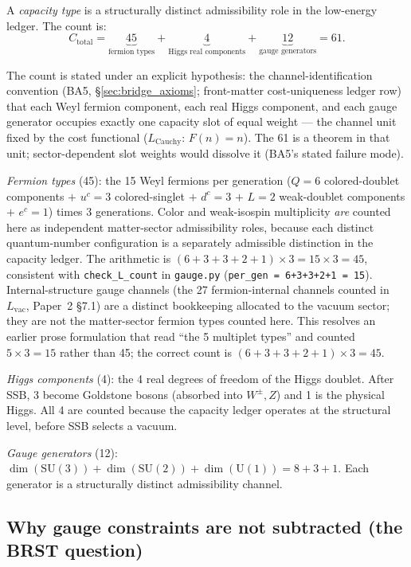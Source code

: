 \documentclass[11pt]{article}
\theoremstyle{definition}
\newcommand{\SU}{\mathrm{SU}}
\newcommand{\U}{\mathrm{U}}
\begin{document}
A \emph{capacity type} is a structurally distinct admissibility role
in the low-energy ledger.  The count is:
\begin{equation}
  C_{\mathrm{total}} = \underbrace{45}_{\text{fermion types}}
    + \underbrace{4}_{\text{Higgs real components}}
    + \underbrace{12}_{\text{gauge generators}} = 61.
\end{equation}

\noindent The count is stated under an explicit hypothesis: the
channel-identification convention (BA5, \S\ref{sec:bridge_axioms};
front-matter cost-uniqueness ledger row) that each Weyl fermion
component, each real Higgs component, and each gauge generator
occupies exactly one capacity slot of equal weight --- the channel
unit fixed by the cost functional ($L_{\mathrm{Cauchy}}$:
$F(n) = n$).  The 61 is a theorem in that unit; sector-dependent slot
weights would dissolve it (BA5's stated failure mode).

\noindent\textit{Fermion types} (45): the 15 Weyl fermions per
generation ($Q = 6$ colored-doublet components $+$ $u^c = 3$
colored-singlet $+$ $d^c = 3$ $+$ $L = 2$ weak-doublet components
$+$ $e^c = 1$) times 3 generations.  Color and weak-isospin
multiplicity \emph{are} counted here as independent matter-sector
admissibility roles, because each distinct quantum-number configuration
is a separately admissible distinction in the capacity ledger.  The
arithmetic is $(6+3+3+2+1) \times 3 = 15 \times 3 = 45$, consistent
with \texttt{check\_L\_count} in \texttt{gauge.py} (\texttt{per\_gen =
6+3+3+2+1 = 15}).  Internal-structure gauge channels (the 27
fermion-internal channels counted in $L_{\mathrm{vac}}$, Paper~2
\S7.1) are a distinct bookkeeping allocated to the vacuum sector;
they are not the matter-sector fermion types counted here.  This
resolves an earlier prose formulation that read ``the 5 multiplet
types'' and counted $5 \times 3 = 15$ rather than 45; the correct
count is $(6+3+3+2+1) \times 3 = 45$.

\noindent\textit{Higgs components} (4): the 4 real degrees of freedom
of the Higgs doublet.  After SSB, 3 become Goldstone bosons (absorbed
into $W^\pm, Z$) and 1 is the physical Higgs.  All 4 are counted
because the capacity ledger operates at the structural level, before
SSB selects a vacuum.

\noindent\textit{Gauge generators} (12): $\dim(\SU(3)) + \dim(\SU(2))
+ \dim(\U(1)) = 8 + 3 + 1$.  Each generator is a structurally distinct
admissibility channel.

\subsection{Why gauge constraints are not subtracted (the BRST question)}
\label{sec:BRST}
\end{document}
